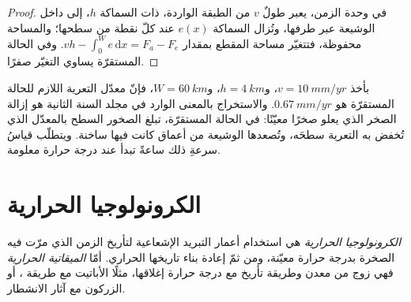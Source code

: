 \begin{proof}
في وحدة الزمن، يعبر طولٌ $v$ من الطبقة الواردة، ذات السماكة $h$،
إلى داخل الوشيعة عبر طرفها، وتُزال السماكة $e(x)$ عند كلّ
نقطة من سطحها؛ والمساحة محفوظة، فتتغيّر مساحة المقطع
بمقدار $vh - \int_0^W e\,\mathrm dx = F_a - F_e$. وفي الحالة المستقرّة
يساوي التغيّر صفرًا.
\end{proof}

بأخذ $v = \qty{10}{mm/yr}$، و$h = \qty{4}{km}$، و$W = \qty{60}{km}$، فإنّ
معدّل التعرية اللازم للحالة المستقرّة هو $\qty{0.67}{mm/yr}$. والاستخراج
بالمعنى الوارد في مجلد السنة الثانية هو إزالة الصخر الذي يعلو صخرًا معيّنًا:
في الحالة المستقرّة، تبلغ الصخور السطح بالمعدّل الذي تُخفض به التعرية
سطحَه، وتُصعدها الوشيعة من أعماق كانت فيها ساخنة. ويتطلّب قياسُ
سرعةِ ذلك ساعةً تبدأ عند درجة حرارة معلومة.

\section{الكرونولوجيا الحرارية}\label{sec:b3:orogenic-wedges:thermochronology}

\begin{definition}\label{def:b3:orogenic-wedges:thermochronology}
\emph{الكرونولوجيا الحرارية} هي استخدام أعمار التبريد الإشعاعية
لتأريخ الزمن الذي مرّت فيه الصخرة بدرجة حرارة معيّنة،
ومن ثمّ إعادة بناء تاريخها الحراري. أمّا
\emph{الميقاتية الحرارية} فهي زوج من معدن
وطريقة تأريخ مع درجة حرارة إغلاقها، مثلًا الأباتيت مع
طريقة ، أو الزركون مع آثار الانشطار.
\end{definition}

